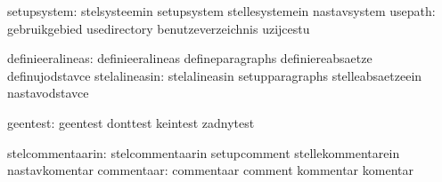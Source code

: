                   setupsystem:  stelsysteemin                setupsystem
                                stellesystemein              nastavsystem
                      usepath:  gebruikgebied                usedirectory
                                benutzeverzeichnis           uzijcestu %

             definieeralineas:  definieeralineas             defineparagraphs
                                definiereabsaetze            definujodstavce
                stelalineasin:  stelalineasin                setupparagraphs
                                stelleabsaetzeein            nastavodstavce

                     geentest:  geentest                     donttest
                                keintest                     zadnytest

             stelcommentaarin:  stelcommentaarin             setupcomment
                                stellekommentarein           nastavkomentar
                   commentaar:  commentaar                   comment
                                kommentar                    komentar

